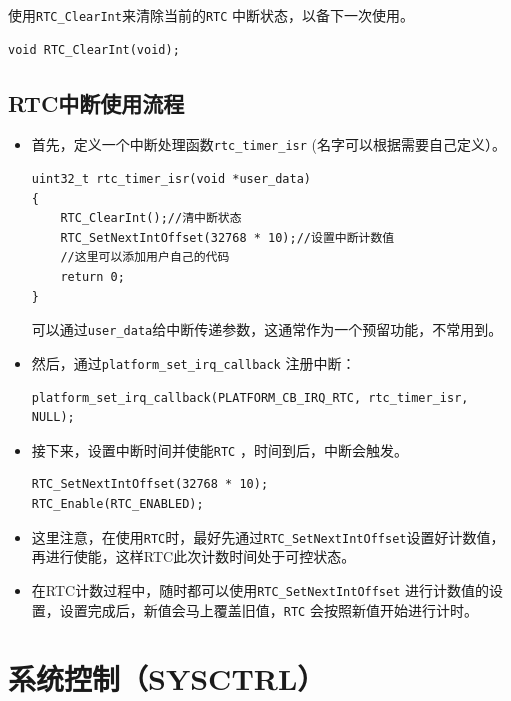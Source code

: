 \documentclass[
  12pt,
]{book}
\begin{document}
使用\texttt{RTC\_ClearInt}来清除当前的\texttt{RTC} 中断状态，以备下一次使用。

\begin{verbatim}
void RTC_ClearInt(void);
\end{verbatim}

\hypertarget{rtcux4e2dux65adux4f7fux7528ux6d41ux7a0b}{%
\section{RTC中断使用流程}\label{rtcux4e2dux65adux4f7fux7528ux6d41ux7a0b}}

\begin{itemize}
\item
  首先，定义一个中断处理函数\texttt{rtc\_timer\_isr} (名字可以根据需要自己定义）。

\begin{verbatim}
uint32_t rtc_timer_isr(void *user_data)
{
    RTC_ClearInt();//清中断状态
    RTC_SetNextIntOffset(32768 * 10);//设置中断计数值
    //这里可以添加用户自己的代码
    return 0;
}
\end{verbatim}

  可以通过\texttt{user\_data}给中断传递参数，这通常作为一个预留功能，不常用到。
\item
  然后，通过\texttt{platform\_set\_irq\_callback} 注册中断：

\begin{verbatim}
platform_set_irq_callback(PLATFORM_CB_IRQ_RTC, rtc_timer_isr, NULL);
\end{verbatim}
\item
  接下来，设置中断时间并使能\texttt{RTC} ，时间到后，中断会触发。

\begin{verbatim}
RTC_SetNextIntOffset(32768 * 10);
RTC_Enable(RTC_ENABLED);
\end{verbatim}
\item
  这里注意，在使用\texttt{RTC}时，最好先通过\texttt{RTC\_SetNextIntOffset}设置好计数值，再进行使能，这样RTC此次计数时间处于可控状态。
\item
  在RTC计数过程中，随时都可以使用\texttt{RTC\_SetNextIntOffset} 进行计数值的设置，设置完成后，新值会马上覆盖旧值，\texttt{RTC} 会按照新值开始进行计时。
\end{itemize}

\hypertarget{ch-sysctrl}{%
\chapter{系统控制（SYSCTRL）}\label{ch-sysctrl}}
\end{document}
